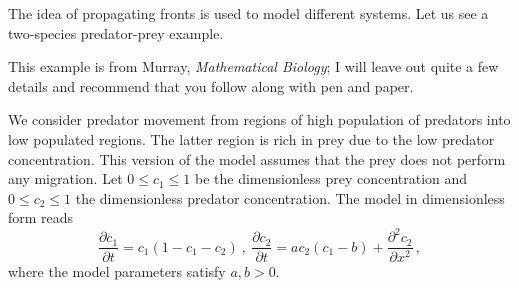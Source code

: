 The idea of propagating fronts is used to model different systems. Let us see a two-species 
predator-prey example. 
\begin{example}\label{example:multifront}
	This example is from Murray, \textit{Mathematical Biology}; I will leave out 
	quite a few details and recommend that you follow along with pen and paper. 

	We consider predator movement from regions of 
	high population of predators into low populated regions. The latter region is
	rich in prey due to the low predator concentration. This version of the model
	assumes that the prey does not perform any migration. Let
	$0 \leq c_1 \leq 1$ be the dimensionless prey concentration and
	$0 \leq c_2 \leq 1$ the dimensionless predator concentration. The model in 
	dimensionless form reads
	\begin{equation}
		\label{eq:pp0}
		\frac{\partial c_1}{\partial t} = c_1(1-c_1-c_2) \ ,
		\ \frac{\partial c_2}{\partial t} =
		ac_2(c_1-b) + \frac{\partial^2 c_2}{\partial x^2} \, ,
	\end{equation}
	where the model parameters satisfy $a,b > 0$. 


\end{example}
